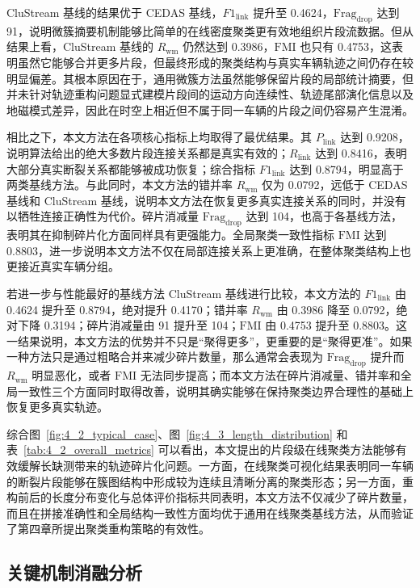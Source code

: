 \documentclass{xdupgthesis}
\begin{document}
CluStream 基线的结果优于 CEDAS 基线，$F1_{\mathrm{link}}$ 提升至 0.4624，$\mathrm{Frag}_{\mathrm{drop}}$ 达到 91，说明微簇摘要机制能够比简单的在线密度聚类更有效地组织片段流数据。但从结果上看，CluStream 基线的 $R_{\mathrm{wm}}$ 仍然达到 0.3986，$\mathrm{FMI}$ 也只有 0.4753，这表明虽然它能够合并更多片段，但最终形成的聚类结构与真实车辆轨迹之间仍存在较明显偏差。其根本原因在于，通用微簇方法虽然能够保留片段的局部统计摘要，但并未针对轨迹重构问题显式建模片段间的运动方向连续性、轨迹尾部演化信息以及地磁模式差异，因此在时空上相近但不属于同一车辆的片段之间仍容易产生混淆。

相比之下，本文方法在各项核心指标上均取得了最优结果。其 $P_{\mathrm{link}}$ 达到 0.9208，说明算法给出的绝大多数片段连接关系都是真实有效的；$R_{\mathrm{link}}$ 达到 0.8416，表明大部分真实断裂关系都能够被成功恢复；综合指标 $F1_{\mathrm{link}}$ 达到 0.8794，明显高于两类基线方法。与此同时，本文方法的错并率 $R_{\mathrm{wm}}$ 仅为 0.0792，远低于 CEDAS 基线和 CluStream 基线，说明本文方法在恢复更多真实连接关系的同时，并没有以牺牲连接正确性为代价。碎片消减量 $\mathrm{Frag}_{\mathrm{drop}}$ 达到 104，也高于各基线方法，表明其在抑制碎片化方面同样具有更强能力。全局聚类一致性指标 $\mathrm{FMI}$ 达到 0.8803，进一步说明本文方法不仅在局部连接关系上更准确，在整体聚类结构上也更接近真实车辆分组。

若进一步与性能最好的基线方法 CluStream 基线进行比较，本文方法的 $F1_{\mathrm{link}}$ 由 0.4624 提升至 0.8794，绝对提升 0.4170；错并率 $R_{\mathrm{wm}}$ 由 0.3986 降至 0.0792，绝对下降 0.3194；碎片消减量由 91 提升至 104；$\mathrm{FMI}$ 由 0.4753 提升至 0.8803。这一结果说明，本文方法的优势并不只是“聚得更多”，更重要的是“聚得更准”。如果一种方法只是通过粗略合并来减少碎片数量，那么通常会表现为 $\mathrm{Frag}_{\mathrm{drop}}$ 提升而 $R_{\mathrm{wm}}$ 明显恶化，或者 $\mathrm{FMI}$ 无法同步提高；而本文方法在碎片消减量、错并率和全局一致性三个方面同时取得改善，说明其确实能够在保持聚类边界合理性的基础上恢复更多真实轨迹。

综合图~\ref{fig:4_2_typical_case}、图~\ref{fig:4_3_length_distribution} 和表~\ref{tab:4_2_overall_metrics} 可以看出，本文提出的片段级在线聚类方法能够有效缓解长缺测带来的轨迹碎片化问题。一方面，在线聚类可视化结果表明同一车辆的断裂片段能够在簇图结构中形成较为连续且清晰分离的聚类形态；另一方面，重构前后的长度分布变化与总体评价指标共同表明，本文方法不仅减少了碎片数量，而且在拼接准确性和全局结构一致性方面均优于通用在线聚类基线方法，从而验证了第四章所提出聚类重构策略的有效性。


\subsection{关键机制消融分析}
\end{document}
